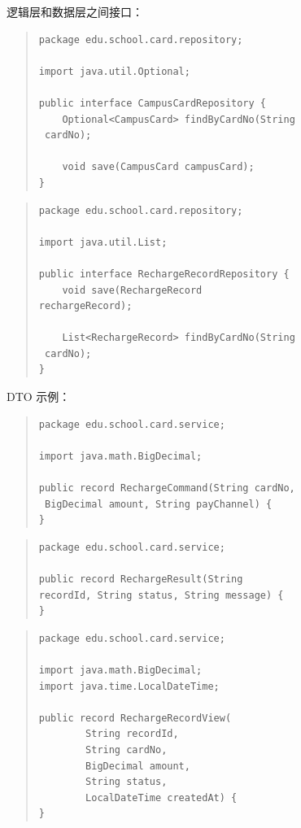 \documentclass[UTF8,zihao=-4]{ctexart}
\begin{document}
逻辑层和数据层之间接口：

\begin{quote}
\footnotesize
\begin{verbatim}
package edu.school.card.repository;

import java.util.Optional;

public interface CampusCardRepository {
    Optional<CampusCard> findByCardNo(String
 cardNo);

    void save(CampusCard campusCard);
}
\end{verbatim}
\end{quote}

\begin{quote}
\footnotesize
\begin{verbatim}
package edu.school.card.repository;

import java.util.List;

public interface RechargeRecordRepository {
    void save(RechargeRecord 
rechargeRecord);

    List<RechargeRecord> findByCardNo(String
 cardNo);
}
\end{verbatim}
\end{quote}

DTO 示例：

\begin{quote}
\footnotesize
\begin{verbatim}
package edu.school.card.service;

import java.math.BigDecimal;

public record RechargeCommand(String cardNo,
 BigDecimal amount, String payChannel) {
}
\end{verbatim}
\end{quote}

\begin{quote}
\footnotesize
\begin{verbatim}
package edu.school.card.service;

public record RechargeResult(String 
recordId, String status, String message) {
}
\end{verbatim}
\end{quote}

\begin{quote}
\footnotesize
\begin{verbatim}
package edu.school.card.service;

import java.math.BigDecimal;
import java.time.LocalDateTime;

public record RechargeRecordView(
        String recordId,
        String cardNo,
        BigDecimal amount,
        String status,
        LocalDateTime createdAt) {
}
\end{verbatim}
\end{quote}
\end{document}
